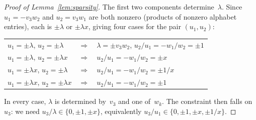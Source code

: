 \documentclass[12pt,a4paper]{article}
\renewcommand{\arraystretch}{1.2}
\begin{document}
\begin{proof}[Proof of Lemma~\ref{lem:sparsity}]
The first two components determine~$\lambda$.  Since $u_1 = -v_3 w_2$
and $u_2 = v_3 w_1$ are both nonzero (products of nonzero alphabet
entries), each is $\pm\lambda$ or $\pm\lambda x$, giving four cases
for the pair $(u_1, u_2)$:
\begin{center}
\renewcommand{\arraystretch}{1.1}
\begin{tabular}{@{}lll@{}}
$u_1 = \pm\lambda$, $u_2 = \pm\lambda$ & $\Rightarrow$ & $\lambda = \pm v_3 w_2$,\; $u_2/u_1 = -w_1/w_2 = \pm 1$ \\
$u_1 = \pm\lambda$, $u_2 = \pm\lambda x$ & $\Rightarrow$ & $u_2/u_1 = -w_1/w_2 = \pm x$ \\
$u_1 = \pm\lambda x$, $u_2 = \pm\lambda$ & $\Rightarrow$ & $u_2/u_1 = -w_1/w_2 = \pm 1/x$ \\
$u_1 = \pm\lambda x$, $u_2 = \pm\lambda x$ & $\Rightarrow$ & $u_2/u_1 = -w_1/w_2 = \pm 1$
\end{tabular}
\end{center}
In every case, $\lambda$ is determined by~$v_3$ and one of~$w_k$.
The constraint then falls on~$u_3$: we need
$u_3/\lambda \in \{0, \pm 1, \pm x\}$, equivalently
$u_3/u_1 \in \{0, \pm 1, \pm x, \pm 1/x\}$.


\end{proof}
\end{document}
